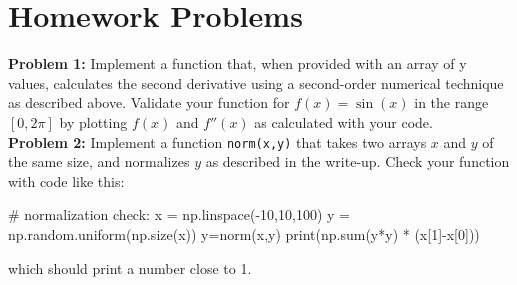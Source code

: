 \documentclass[12pt]{article}
\begin{document}


\section{Homework Problems}

\noindent
{\bf Problem 1:}  Implement a function that, when provided with an array of y values, calculates the second derivative using a second-order numerical technique as described above.  Validate your function for $f(x) = \sin(x)$ in the range $[0,2\pi]$ by plotting $f(x)$ and $f''(x)$ as calculated with your code.\\[5pt]

\noindent
{\bf Problem 2:}  Implement a function {\tt norm(x,y)} that takes two arrays $x$ and $y$ of the same size, and normalizes $y$ as described in the write-up.  Check your function with code like this:
\begin{python}
# normalization check:
x = np.linspace(-10,10,100)
y = np.random.uniform(np.size(x))
y=norm(x,y)
print(np.sum(y*y) * (x[1]-x[0]))
\end{python}
which should print a number close to 1.\\[5pt]
\end{document}
